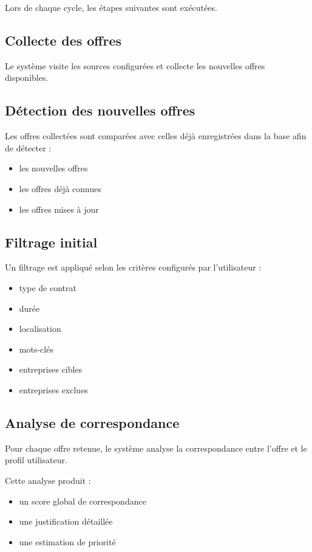 \documentclass[11pt,a4paper]{article}
\begin{document}
Lors de chaque cycle, les étapes suivantes sont exécutées.

\subsection{Collecte des offres}

Le système visite les sources configurées et collecte les nouvelles offres disponibles.

\subsection{Détection des nouvelles offres}

Les offres collectées sont comparées avec celles déjà enregistrées dans la base afin de détecter :

\begin{itemize}
\item les nouvelles offres
\item les offres déjà connues
\item les offres mises à jour
\end{itemize}

\subsection{Filtrage initial}

Un filtrage est appliqué selon les critères configurés par l’utilisateur :

\begin{itemize}
\item type de contrat
\item durée
\item localisation
\item mots-clés
\item entreprises cibles
\item entreprises exclues
\end{itemize}

\subsection{Analyse de correspondance}

Pour chaque offre retenue, le système analyse la correspondance entre l’offre et le profil utilisateur.

Cette analyse produit :

\begin{itemize}
\item un score global de correspondance
\item une justification détaillée
\item une estimation de priorité
\end{itemize}
\end{document}
